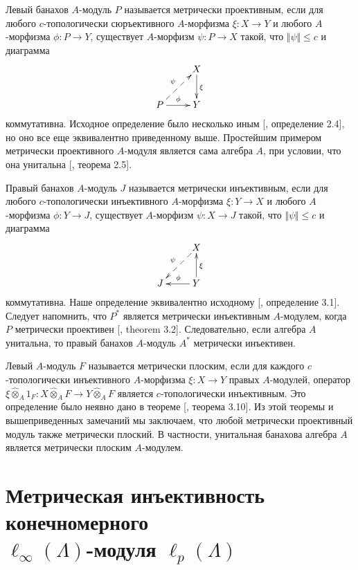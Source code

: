 \documentclass[12pt]{article}
\newcommand{\projmodtens}[1]{\mathbin{\widehat{\otimes}}_{#1}}
\begin{document}
Левый банахов $A$-модуль $P$ называется метрически проективным, если для 
любого $c$-топологически сюръективного $A$-морфизма $\xi:X\to Y$ и любого 
$A$-морфизма $\phi:P\to Y$, существует $A$-морфизм $\psi:P\to X$ такой, что 
$\Vert\psi\Vert\leq c$ и диаграмма
$$
    \xymatrix{
    & {X} \ar[d]^{\xi}\\
    {P} \ar@{-->}[ur]^{\psi} \ar[r]^{\phi} &{Y}}
$$
коммутативна. Исходное определение было несколько 
иным [\cite{GravInjProjBanMod}, определение 2.4], но оно все еще 
эквивалентно приведенному выше. Простейшим примером метрически проективного 
$A$-модуля является сама алгебра $A$, при условии, что она унитальна 
[\cite{GravInjProjBanMod}, теорема 2.5].

Правый банахов $A$-модуль $J$ называется метрически инъективным, если для 
любого $c$-топологически инъективного $A$-морфизма $\xi:Y\to X$ и 
любого $A$-морфизма $\phi:Y\to J$, существует $A$-морфизм $\psi:X\to J$ такой, 
что $\Vert\psi\Vert\leq c$ и диаграмма
\[
    \xymatrix{
    & {X} \ar@{-->}[dl]_{\psi} \\
    {J} &{Y} \ar[l]_{\phi} \ar[u]_{\xi}}
\]
коммутативна. Наше определение эквивалентно исходному 
[\cite{GravInjProjBanMod}, определение 3.1]. Следует напомнить, 
что $P^*$ является метрически инъективным $A$-модулем, когда $P$ метрически 
проективен [\cite{GravInjProjBanMod}, theorem 3.2]. Следовательно, если алгебра 
$A$ унитальна, то правый банахов $A$-модуль $A^*$ метрически инъективен.

Левый $A$-модуль $F$ называется метрически плоским, если для каждого 
$c$-топологически инъективного $A$-морфизма $\xi:X\to Y$ правых $A$-модулей, 
оператор $\xi\projmodtens{A} 1_F:X\projmodtens{A} F\to Y\projmodtens{A} F$ 
является $c$-топологически инъективным. Это определение было неявно дано в 
теореме [\cite{GravInjProjBanMod}, теорема 3.10]. Из этой теоремы и вышеприведенных 
замечаний мы заключаем, что любой метрически проективный модуль также 
метрически плоский. В частности, унитальная банахова алгебра $A$ является 
метрически плоским $A$-модулем.


\section{Метрическая инъективность конечномерного \\
\texorpdfstring{$\ell_\infty(\Lambda)$}{linftyLmbd}-модуля 
\texorpdfstring{$\ell_p(\Lambda)$}{lpLmbd}}
\label{MetrInjlinftynlpn}
\end{document}
